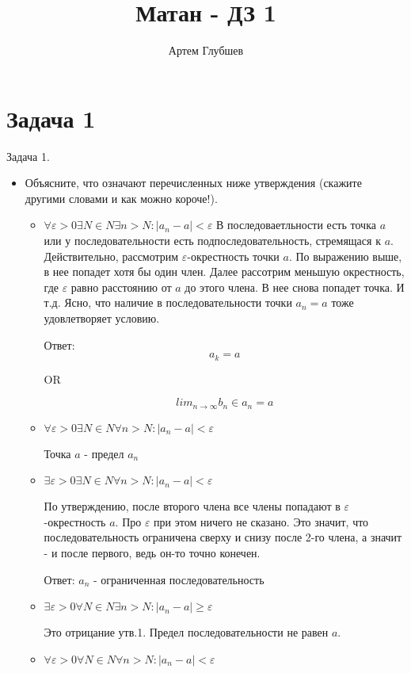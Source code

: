 \documentclass[11pt]{article}
\title{Матан - ДЗ 1}
\author{Артем Глубшев}
\date{}
\begin{document}
\maketitle

\section{Задача 1}
Задача 1. 
\begin{itemize}
\item
 Объясните, что означают перечисленных ниже утверждения (скажите другими
словами и как можно короче!).

\begin{itemize}
\item $\forall  \varepsilon  > 0 \exists N \in N \exists n > N : |a_n - a| < \varepsilon $ В последоваетльности есть точка $a$ или у последовательности есть подпоследовательность, стремящася к $a$. Действительно, рассмотрим $\varepsilon$-окрестность точки $a$. По выражению выше, в нее попадет хотя бы один член. Далее рассотрим меньшую окрестность, где $\varepsilon$ равно расстоянию от $a$ до этого члена. В нее снова попадет точка. И т.д. Ясно, что наличие в последовательности точки $a_n=a$ тоже удовлетворяет условию.



Ответ: $$a_k=a$$
\begin{center}OR
\end{center}$$lim_{n\to \infty}b_{n} \in a_n =a$$
\item $\forall  \varepsilon  > 0 \exists N \in N \forall   n > N : |a_n - a| < \varepsilon $

Точка $a$ - предел $a_n$
\item $\exists \varepsilon  > 0 \exists N \in N \forall  n > N : |a_n - a| < \varepsilon $

По утверждению, после второго члена все члены попадают в $\varepsilon$-окрестность $a$. Про $\varepsilon$ при этом ничего не сказано. Это значит, что последовательность ограничена сверху и снизу после 2-го члена, а значит - и после первого, ведь он-то точно конечен.
 
 Ответ: $a_n$ - ограниченная последовательность
 
\item $\exists \varepsilon  > 0 \forall  N \in N \exists n > N : |a_n - a| \ge \varepsilon $

Это отрицание утв.1. Предел последовательности не равен $a$.

\item $\forall  \varepsilon  > 0 \forall  N \in N \forall  n > N : |a_n - a| < \varepsilon $


\end{itemize}
\end{itemize}
\end{document}
